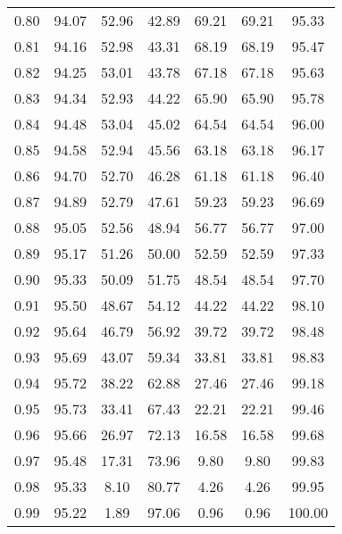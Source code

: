 \begin{tabular}{|c|c|c|c|c|c|c|}
      0.80 &     94.07 &     52.96 &      42.89 &   69.21 &      69.21 &         95.33 \\
      0.81 &     94.16 &     52.98 &      43.31 &   68.19 &      68.19 &         95.47 \\
      0.82 &     94.25 &     53.01 &      43.78 &   67.18 &      67.18 &         95.63 \\
      0.83 &     94.34 &     52.93 &      44.22 &   65.90 &      65.90 &         95.78 \\
      0.84 &     94.48 &     53.04 &      45.02 &   64.54 &      64.54 &         96.00 \\
      0.85 &     94.58 &     52.94 &      45.56 &   63.18 &      63.18 &         96.17 \\
      0.86 &     94.70 &     52.70 &      46.28 &   61.18 &      61.18 &         96.40 \\
      0.87 &     94.89 &     52.79 &      47.61 &   59.23 &      59.23 &         96.69 \\
      0.88 &     95.05 &     52.56 &      48.94 &   56.77 &      56.77 &         97.00 \\
      0.89 &     95.17 &     51.26 &      50.00 &   52.59 &      52.59 &         97.33 \\
      0.90 &     95.33 &     50.09 &      51.75 &   48.54 &      48.54 &         97.70 \\
      0.91 &     95.50 &     48.67 &      54.12 &   44.22 &      44.22 &         98.10 \\
      0.92 &     95.64 &     46.79 &      56.92 &   39.72 &      39.72 &         98.48 \\
      0.93 &     95.69 &     43.07 &      59.34 &   33.81 &      33.81 &         98.83 \\
      0.94 &     95.72 &     38.22 &      62.88 &   27.46 &      27.46 &         99.18 \\
      0.95 &     95.73 &     33.41 &      67.43 &   22.21 &      22.21 &         99.46 \\
      0.96 &     95.66 &     26.97 &      72.13 &   16.58 &      16.58 &         99.68 \\
      0.97 &     95.48 &     17.31 &      73.96 &    9.80 &       9.80 &         99.83 \\
      0.98 &     95.33 &      8.10 &      80.77 &    4.26 &       4.26 &         99.95 \\
      0.99 &     95.22 &      1.89 &      97.06 &    0.96 &       0.96 &        100.00 \\
\bottomrule
\end{tabular}
